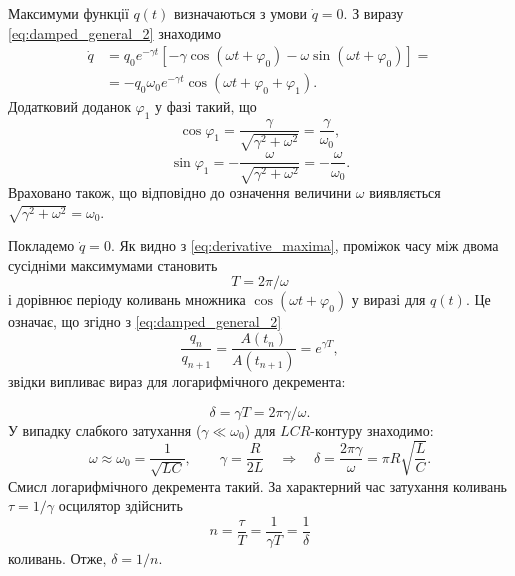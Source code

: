 Максимуми функції $q(t)$ визначаються з умови $\dot{q} = 0$. З виразу \eqref{eq:damped_general_2} знаходимо
\begin{equation}\label{eq:derivative_maxima}
	\begin{aligned}
		\dot{q} & = q_0 e^{-\gamma t}\left[-\gamma \cos(\omega t + \varphi_0) - \omega \sin(\omega t + \varphi_0)\right] = \\
		        & = -q_0 \omega_0 e^{-\gamma t} \cos(\omega t + \varphi_0 + \varphi_1).
	\end{aligned}
\end{equation}
Додатковий доданок $\varphi_1$ у фазі такий, що
\begin{equation}\label{eq:varphi1}
	\cos\varphi_1 = \frac{\gamma}{\sqrt{\gamma^2 + \omega^2}} = \frac{\gamma}{\omega_0},
\end{equation}
\begin{equation}\label{eq:varphi1_sin}
	\sin\varphi_1 = -\frac{\omega}{\sqrt{\gamma^2 + \omega^2}} = -\frac{\omega}{\omega_0}.
\end{equation}
Враховано також, що відповідно до означення величини $\omega$ виявляється $\sqrt{\gamma^2 + \omega^2} = \omega_0$.

Покладемо $\dot{q} = 0$. Як видно з \eqref{eq:derivative_maxima}, проміжок часу між
двома сусідніми максимумами становить
\begin{equation}\label{eq:period}
	T = 2\pi/\omega
\end{equation}
і дорівнює періоду коливань множника $\cos(\omega t + \varphi_0)$ у виразі для
$q(t)$. Це означає, що згідно з \eqref{eq:damped_general_2}
\begin{equation}\label{eq:maxima_ratio}
	\frac{q_n}{q_{n+1}} = \frac{A(t_n)}{A(t_{n+1})} = e^{\gamma T},
\end{equation}
звідки випливає вираз для логарифмічного декремента:

\begin{equation}\label{eq:delta_explicit}
	\delta = \gamma T = 2\pi\gamma/\omega.
\end{equation}
У випадку слабкого затухання ($\gamma \ll \omega_0$) для $LCR$-контуру знаходимо:
\begin{equation}\label{eq:delta_weak}
	\omega \approx \omega_0 = \frac{1}{\sqrt{LC}}, \qquad
	\gamma = \frac{R}{2L}
	\quad\Rightarrow\quad
	\delta = \frac{2\pi\gamma}{\omega} = \pi R \sqrt{\frac{L}{C}}.
\end{equation}
Смисл логарифмічного декремента такий. За характерний
час затухання коливань $\tau = 1/\gamma$ осцилятор здійснить
\begin{equation}\label{eq:number_oscillations}
	n = \frac{\tau}{T} = \frac{1}{\gamma T} = \frac{1}{\delta}
\end{equation}
коливань. Отже, $\delta = 1/n$.

